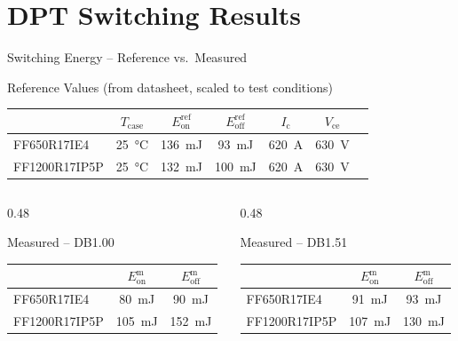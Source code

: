 \documentclass[aspectratio=169, 10pt]{beamer}
\begin{document}
\section{DPT Switching Results}

\begin{frame}{Switching Energy -- Reference vs.\ Measured}
  \small
  \renewcommand{\arraystretch}{1.5}

  \begin{block}{Reference Values (from datasheet, scaled to test conditions)}
    \centering
    \begin{tabular}{l c c c c c c}
      \toprule
      & $T_\text{case}$ & $E_\text{on}^\text{ref}$ & $E_\text{off}^\text{ref}$ & $I_\text{c}$ & $V_\text{ce}$ \\
      \midrule
      FF650R17IE4   & \SI{25}{\celsius} & \SI{136}{\milli\joule} & \SI{93}{\milli\joule}  & \SI{620}{\ampere} & \SI{630}{\volt} \\
      FF1200R17IP5P & \SI{25}{\celsius} & \SI{132}{\milli\joule} & \SI{100}{\milli\joule} & \SI{620}{\ampere} & \SI{630}{\volt} \\
      \bottomrule
    \end{tabular}
  \end{block}

  \vspace{6pt}
  \begin{columns}[T]
    \begin{column}{0.48\textwidth}
      \begin{block}{Measured -- DB1.00}
        \centering
        \begin{tabular}{l c c}
          \toprule
          & $E_\text{on}^\text{m}$ & $E_\text{off}^\text{m}$ \\
          \midrule
          FF650R17IE4   & \SI{80}{\milli\joule}  & \SI{90}{\milli\joule}  \\
          FF1200R17IP5P & \SI{105}{\milli\joule} & \SI{152}{\milli\joule} \\
          \bottomrule
        \end{tabular}
      \end{block}
    \end{column}
    \begin{column}{0.48\textwidth}
      \begin{block}{Measured -- DB1.51}
        \centering
        \begin{tabular}{l c c}
          \toprule
          & $E_\text{on}^\text{m}$ & $E_\text{off}^\text{m}$ \\
          \midrule
          FF650R17IE4   & \SI{91}{\milli\joule}  & \SI{93}{\milli\joule}  \\
          FF1200R17IP5P & \SI{107}{\milli\joule} & \SI{130}{\milli\joule} \\
          \bottomrule
        \end{tabular}
      \end{block}
    \end{column}
  \end{columns}
\end{frame}
\end{document}
